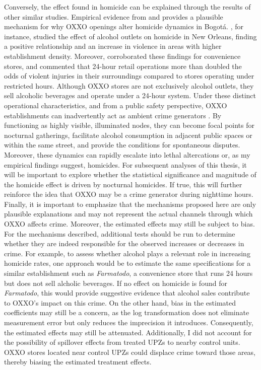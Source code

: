 \documentclass[12pt]{article}
\begin{document}
Conversely, the effect found in homicide can be explained through the results of other similar studies. Empirical evidence from \textcite{Scribner1999} and \textcite{Bowen2022} provides a plausible mechanism for why OXXO openings alter homicide dynamics in Bogotá. \textcite{Scribner1999}, for instance, studied the effect of alcohol outlets on homicide in New Orleans, finding a positive relationship and an increase in violence in areas with higher establishment density. Moreover, \textcite{Bowen2022} corroborated these findings for convenience stores, and commented that 24-hour retail operations more than doubled the odds of violent injuries in their surroundings compared to stores operating under restricted hours. Although OXXO stores are not exclusively alcohol outlets, they sell alcoholic beverages and operate under a 24-hour system. Under these distinct operational characteristics, and from a public safety perspective, OXXO establishments can inadvertently act as ambient crime generators \parencite{Davis2021}. By functioning as highly visible, illuminated nodes, they can become focal points for nocturnal gatherings, facilitate alcohol consumption in adjacent public spaces or within the same street, and provide the conditions for spontaneous disputes. Moreover, these dynamics can rapidly escalate into lethal altercations or, as my empirical findings suggest, homicides. For subsequent analyses of this thesis, it will be important to explore whether the statistical significance and magnitude of the homicide effect is driven by nocturnal homicides. If true, this will further reinforce the idea that OXXO may be a crime generator during nighttime hours.\\

Finally, it is important to emphasize that the mechanisms proposed here are only plausible explanations and may not represent the actual channels through which OXXO affects crime. Moreover, the estimated effects may still be subject to bias. For the mechanisms described, additional tests should be run to determine whether they are indeed responsible for the observed increases or decreases in crime. For example, to assess whether alcohol plays a relevant role in increasing homicide rates, one approach would be to estimate the same specifications for a similar establishment such as \textit{Farmatodo}, a convenience store that runs 24 hours but does not sell alcholic beverages. If no effect on homicide is found for  \textit{Farmatodo}, this would provide suggestive evidence that alcohol sales contribute to OXXO's impact on this crime. On the other hand, bias in the estimated coefficients may still be a concern, as the log transformation does not eliminate measurement error but only reduces the imprecision it introduces. Consequently, the estimated effects may still be attenuated. Additionally, I did not account for the possibility of spillover effects from treated UPZs to nearby control units. OXXO stores located near control UPZs could displace crime toward those areas, thereby biasing the estimated treatment effects.
\end{document}
